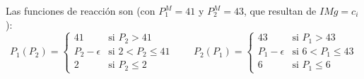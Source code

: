 \begin{parts}
\begin{solution}
Las funciones de reacción son (con $P_1^M = 41$ y $P_2^M = 43$, que resultan de $IMg = c_i$):
\[
  P_1(P_2) =
  \begin{cases}
    41 & \text{si } P_2 > 41 \\
    P_2 - \epsilon & \text{si } 2 < P_2 \leq 41 \\
    2 & \text{si } P_2 \leq 2
  \end{cases}
  \qquad
  P_2(P_1) =
  \begin{cases}
    43 & \text{si } P_1 > 43 \\
    P_1 - \epsilon & \text{si } 6 < P_1 \leq 43 \\
    6 & \text{si } P_1 \leq 6
  \end{cases}
\]

\end{solution}
\end{parts}

